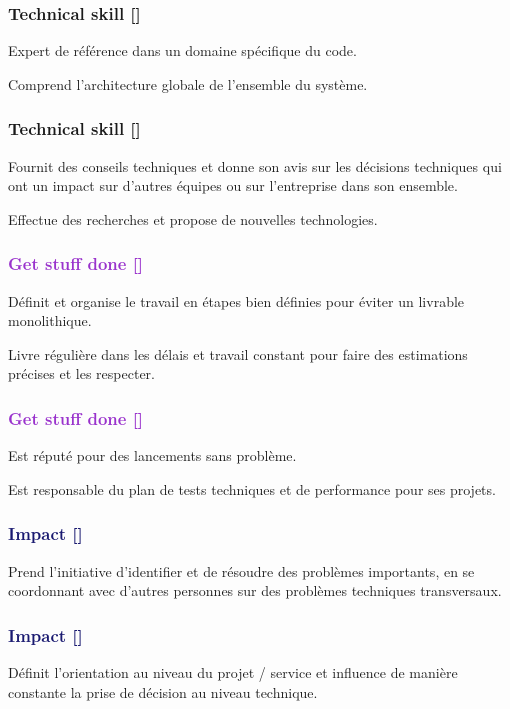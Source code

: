 \documentclass[a4paper, french, openany, 12pt]{book}
\newcommand\dex{\textcolor{BrickRed}{\textbf{Technical skill [\bsc{DEX}]}}}
\newcommand\str{\textcolor{DarkOrchid}{\textbf{Get stuff done [\bsc{STR}]}}}
\newcommand\wis{\textcolor{MidnightBlue}{\textbf{Impact [\bsc{WIS}]}}}
\begin{document}
\begin{multicols}{2}

  \subsubsection*{\dex}
  Expert de référence dans un domaine spécifique du code.

  Comprend l'architecture globale de l'ensemble du système.

  \subsubsection*{\dex}
  Fournit des conseils techniques et donne son avis sur les décisions techniques qui ont un impact sur d'autres équipes ou
  sur l'entreprise dans son ensemble. 

  Effectue des recherches et propose de nouvelles technologies.

  \subsubsection*{\str}

  Définit et organise le travail en étapes bien définies pour éviter un livrable monolithique.

  Livre régulière dans les délais et travail constant pour faire des estimations précises et les respecter.

  \subsubsection*{\str}

  Est réputé pour des lancements sans problème.

  Est responsable du plan de tests techniques et de performance pour ses projets.

  \subsubsection*{\wis}

  Prend l'initiative d'identifier et de résoudre des problèmes importants, en se coordonnant avec d'autres personnes sur
  des problèmes techniques transversaux.

  \subsubsection*{\wis}

  Définit l'orientation au niveau du projet / service et influence de manière constante la prise de décision au niveau
  technique.


\end{multicols}
\end{document}
